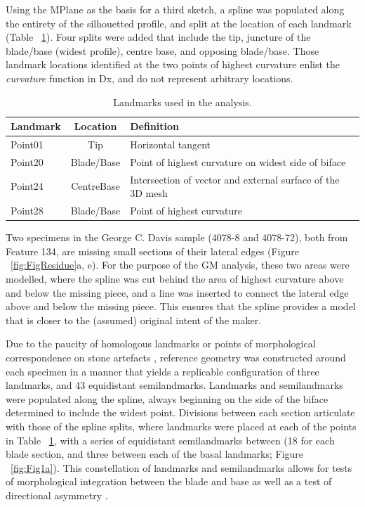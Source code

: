\documentclass[review]{elsarticle}
\begin{document}
Using the MPlane as the basis for a third sketch, a spline was populated along the entirety of the silhouetted profile, and split at the location of each landmark (Table ~\ref{tab:Tbl1}). Four splits were added that include the tip, juncture of the blade/base (widest profile), centre base, and opposing blade/base. Those landmark locations identified at the two points of highest curvature enlist the \textit{curvature} function in Dx, and do not represent arbitrary locations. 

\begin{table}[tbh]\centering
\footnotesize
\caption{Landmarks used in the analysis.}
\centering
\begin{tabular}{lcp{7.5cm}}
\toprule
Landmark & Location & Definition\\
\midrule
Point01 & Tip & Horizontal tangent\\
Point20 & Blade/Base & Point of highest curvature on widest side of biface\\
Point24 & CentreBase & Intersection of vector and external surface of the 3D mesh\\
Point28 & Blade/Base & Point of highest curvature\\
\bottomrule
\end{tabular}
\label{tab:Tbl1}
\end{table}

Two specimens in the George C. Davis sample (4078-8 and 4078-72), both from Feature 134, are missing small sections of their lateral edges (Figure ~\ref{fig:FigResidue}a, e). For the purpose of the GM analysis, these two areas were modelled, where the spline was cut behind the area of highest curvature above and below the missing piece, and a line was inserted to connect the lateral edge above and below the missing piece. This ensures that the spline provides a model that is closer to the (assumed) original intent of the maker. 

Due to the paucity of homologous landmarks or points of morphological correspondence on stone artefacts \citep[81]{RN1730}, reference geometry was constructed around each specimen in a manner that yields a replicable configuration of three landmarks, and 43 equidistant semilandmarks. Landmarks and semilandmarks were populated along the spline, always beginning on the side of the biface determined to include the widest point. Divisions between each section articulate with those of the spline splits, where landmarks were placed at each of the points in Table ~\ref{tab:Tbl1}, with a series of equidistant semilandmarks between (18 for each blade section, and three between each of the basal landmarks; Figure ~\ref{fig:Fig1a}). This constellation of landmarks and semilandmarks allows for tests of morphological integration between the blade and base as well as a test of directional asymmetry \citep{RN4775,RN11619,RN11621,RN11620}.
\end{document}
